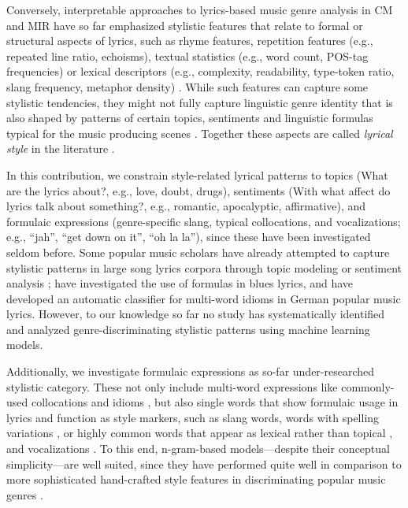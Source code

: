 \documentclass{article}
\begin{document}
Conversely, interpretable approaches to lyrics-based music genre analysis in CM and MIR have so far emphasized stylistic features that relate to formal or structural aspects of lyrics, such as rhyme features, repetition features (e.g., repeated line ratio, echoisms), textual statistics (e.g., word count, POS-tag frequencies) or lexical descriptors (e.g., complexity,  readability, type-token ratio, slang frequency, metaphor density) \cite{muzambiMultidimensionalMIRAnalysis2026,mayerlComparingLyricsFeatures2020, schedlGenreDifferencesSong2019,fell2014lyrics}. While such features can capture some stylistic tendencies, they might not fully capture linguistic genre identity that is also shaped by patterns of certain topics, sentiments and linguistic formulas typical for the music producing scenes \cite{frithWhySongsHave1986}. Together these aspects are called \textit{lyrical style} in the literature \cite{kreyerStylePopSong2007}. 

In this contribution, we constrain style-related lyrical patterns to topics (What are the lyrics about?, e.g., love, doubt, drugs), sentiments (With what affect do lyrics talk about something?, e.g., romantic, apocalyptic, affirmative), and formulaic expressions (genre-specific slang, typical collocations, and vocalizations; e.g., ``jah'', ``get down on it'', ``oh la la''), since these have been investigated seldom before. Some popular music scholars have already attempted to capture stylistic patterns in large song lyrics corpora through topic modeling \cite{bansalLinguisticComplexitySociocultural2025} or sentiment analysis \cite{napierQuantitativeSentimentAnalysis2018}; \cite{stoiaBluesLyricFormulas2020} have investigated the use of formulas in blues lyrics, and \cite{aminDatadrivenIdentificationIdioms2021} have developed an automatic classifier for multi-word idioms in German popular music lyrics. However, to our knowledge so far no study has systematically identified and analyzed genre-discriminating stylistic patterns using machine learning models. 

Additionally, we investigate formulaic expressions as so-far under-researched stylistic category. These not only include multi-word expressions like commonly-used collocations and idioms \cite{wrayFunctionsFormulaicLanguage2000, aminDatadrivenIdentificationIdioms2021}, but also single words that show formulaic usage in lyrics and function as style markers, such as slang words, words with spelling variations \cite{fell2014lyrics,kreyerStylePopSong2007}, or highly common words that appear as lexical rather than topical \cite{fell2014lyrics}, and vocalizations \cite{knaufImNotListening2025}. To this end, n-gram-based models—despite their conceptual simplicity—are well suited, since they have performed quite well in comparison to more sophisticated hand-crafted style features in discriminating popular music genres \cite{mayerlComparingLyricsFeatures2020,fell2014lyrics}.
\end{document}
